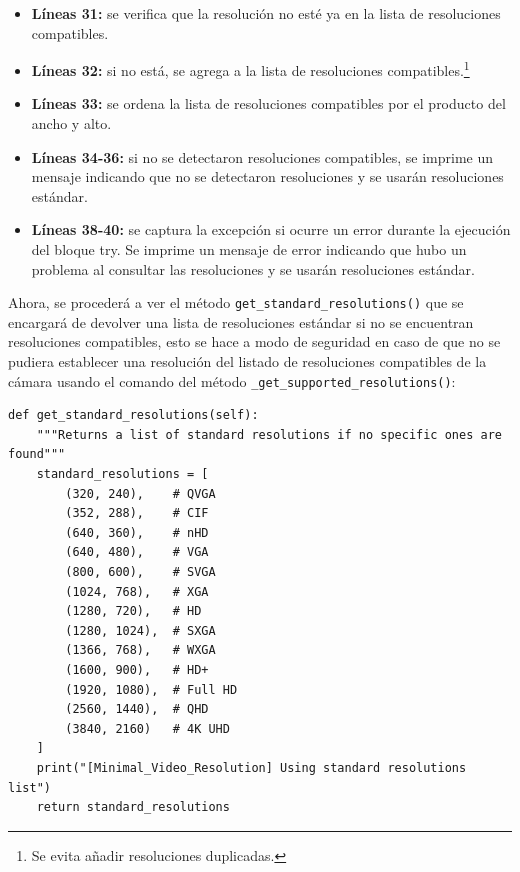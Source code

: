 \begin{itemize}
    \item \textbf{Líneas 31:} se verifica que la resolución no esté ya en la lista de resoluciones compatibles. 
    \item \textbf{Líneas 32:} si no está, se agrega a la lista de resoluciones compatibles.\footnote{Se evita añadir resoluciones duplicadas.}
    \item \textbf{Líneas 33:} se ordena la lista de resoluciones compatibles por el producto del ancho y alto.
    \item \textbf{Líneas 34-36:} si no se detectaron resoluciones compatibles, se imprime un mensaje indicando que no se detectaron resoluciones y se usarán resoluciones estándar.
    \item \textbf{Líneas 38-40:} se captura la excepción si ocurre un error durante la ejecución del bloque try. Se imprime un mensaje de error indicando que hubo un problema al consultar las resoluciones y se usarán resoluciones estándar.
\end{itemize}
\vspace{\baselineskip}

Ahora, se procederá a ver el método \texttt{get\_standard\_resolutions()} que se encargará de devolver una lista de resoluciones estándar si no se encuentran resoluciones compatibles, esto se hace a modo de seguridad en caso de que no se pudiera establecer una resolución del listado de resoluciones compatibles de la cámara usando el comando del método \texttt{\_get\_supported\_resolutions()}:
\begin{lstlisting}[style=pythonstyle, caption={Método \texttt{get\_standard\_resolutions()} de \textit{Minimal\_Video\_Resolution}.}, label={lst:get_standard_resolutions_minimal_video_resolution}]
def get_standard_resolutions(self):
    """Returns a list of standard resolutions if no specific ones are found"""
    standard_resolutions = [
        (320, 240),    # QVGA
        (352, 288),    # CIF
        (640, 360),    # nHD
        (640, 480),    # VGA
        (800, 600),    # SVGA
        (1024, 768),   # XGA
        (1280, 720),   # HD
        (1280, 1024),  # SXGA
        (1366, 768),   # WXGA
        (1600, 900),   # HD+
        (1920, 1080),  # Full HD
        (2560, 1440),  # QHD
        (3840, 2160)   # 4K UHD
    ]
    print("[Minimal_Video_Resolution] Using standard resolutions list")
    return standard_resolutions
\end{lstlisting}
\vspace{\baselineskip}

